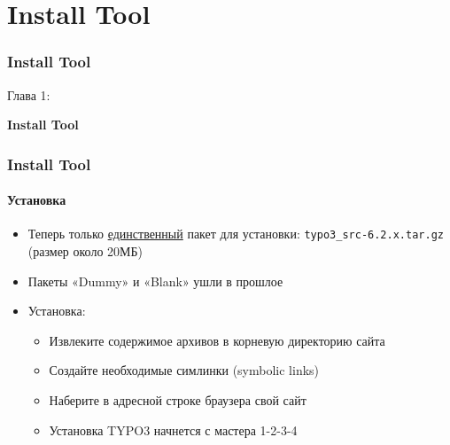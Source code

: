 %

\section{Install Tool}
\begin{frame}[fragile]
	\frametitle{Install Tool}

	\begin{center}\huge{Глава 1:}\end{center}
	\begin{center}\huge{\color{typo3darkgrey}\textbf{Install Tool}}\end{center}

\end{frame}


\begin{frame}[fragile]
	\frametitle{Install Tool}
	\framesubtitle{Установка}

	\begin{itemize}
		\item Теперь только \underline{единственный} пакет для установки:\newline
				\texttt{typo3\_src-6.2.x.tar.gz} (размер около 20МБ)
		\item Пакеты «Dummy» и «Blank» ушли в прошлое
		\item Установка:
			\begin{itemize}
				\item Извлеките содержимое архивов в корневую директорию сайта
				\item Создайте необходимые симлинки (symbolic links)
				\item Наберите в адресной строке браузера свой сайт
				\item Установка TYPO3 начнется с мастера 1-2-3-4
			\end{itemize}

	\end{itemize}

\end{frame}

